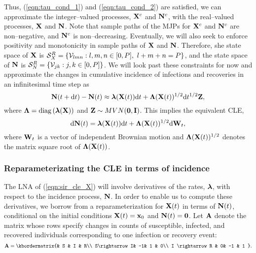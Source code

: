 Thus, (\ref{eqn:tau_cond_1}) and (\ref{eqn:tau_cond_2}) are satisfied, we can approximate the integer--valued processes, $ \mathbf{X}^c $ and $ \mathbf{N}^c $, with the real--valued processes, $ \mathbf{X} $ and $ \mathbf{N} $. Note that sample paths of the MJPs for $ \mathbf{X}^c $ and $ \mathbf{N}^c $ are non--negative, and $ \mathbf{N}^c $ is non--decreasing. Eventually, we will also seek to enforce positivity and monotonicity in sample paths of $ \mathbf{X} $ and $ \mathbf{N} $. Therefore, she state space of $ \mathbf{X} $ is $ \mathcal{S}_X^R = \lbrace \mathcal{V}_{lmn}:l,m,n \in [0,P],\ l+m+n=P\rbrace $, and the state space  of $ \mathbf{N} $ is $ \mathcal{S}_N^R = \lbrace \mathcal{V}_{jk}: j,k \in [0,P]\rbrace $. We will look past these constraints for now and approximate the changes in cumulative incidence of infections and recoveries in an infinitesimal time step as 
\begin{equation}
\mathbf{N}(t+\mathrm{d} t) - \mathbf{N}(t) \approx \boldsymbol{\lambda}(\mathbf{X}(t))\mathrm{d} t + \boldsymbol{\Lambda}(\mathbf{X}(t))^{1/2}\mathrm{d} t^{1/2}\mathbf{Z},
\end{equation}
where $ \boldsymbol{\Lambda} = \mathrm{diag}\left (\boldsymbol{\lambda}(\mathbf{X}) \right )$ and $ \mathbf{Z}\sim MVN(\boldsymbol{0},\mathbf{I}) $. This implies the equivalent CLE,
\begin{equation}
\label{eqn:sir_cle_X}
\mathrm{d} \mathbf{N}(t) = \boldsymbol{\lambda}(\mathbf{X}(t))\mathrm{d} t + \boldsymbol{\Lambda}(\mathbf{X}(t))^{1/2}\mathrm{d}\mathbf{W}_t, 
\end{equation}
where $ \mathbf{W}_t $ is a vector of independent Brownian motion and $ \boldsymbol{\Lambda}(\mathbf{X}(t))^{1/2} $ denotes the matrix square root of $ \boldsymbol{\Lambda}(\mathbf{X}(t)) $. 

\subsubsection{Reparameterizating the CLE in terms of incidence}
\label{subsubsec:cle_repar}
The LNA of (\ref{eqn:sir_cle_X}) will involve derivatives of the rates, $ \boldsymbol{\lambda} $, with respect to the incidence process, $ \mathbf{N} $. In order to enable us to compute these derivatives, we borrow from \cite{breto2009time,ho2016direct} a reparameterization for $ \mathbf{X} (t)$ in terms of $ \mathbf{N}(t) $, conditional on the initial conditions $ \mathbf{X}(t) = \mathbf{x}_0 $ and $ \mathbf{N}(t) = \boldsymbol{0} $. Let $ \mathbf{A} $ denote the matrix whose rows specify changes in counts of susceptible, infected, and recovered individuals corresponding to one infection or recovery event:
\begin{equation}
\label{eqn:sir_stoich}
\bA = \kbordermatrix{& S & I &  R\\
	S\rightarrow I& -1& 1 & 0\\
	I \rightarrow R & 0& -1 & 1
}.
\end{equation}

